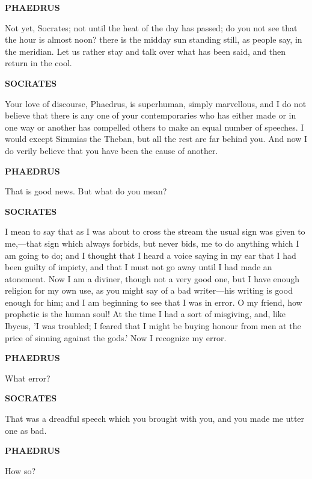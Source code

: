 \documentclass[11pt,letter]{article}
\begin{document}
\par \textbf{PHAEDRUS}
\par   Not yet, Socrates; not until the heat of the day has passed; do you not see that the hour is almost noon? there is the midday sun standing still, as people say, in the meridian. Let us rather stay and talk over what has been said, and then return in the cool.

\par \textbf{SOCRATES}
\par   Your love of discourse, Phaedrus, is superhuman, simply marvellous, and I do not believe that there is any one of your contemporaries who has either made or in one way or another has compelled others to make an equal number of speeches. I would except Simmias the Theban, but all the rest are far behind you. And now I do verily believe that you have been the cause of another.

\par \textbf{PHAEDRUS}
\par   That is good news. But what do you mean?

\par \textbf{SOCRATES}
\par   I mean to say that as I was about to cross the stream the usual sign was given to me,—that sign which always forbids, but never bids, me to do anything which I am going to do; and I thought that I heard a voice saying in my ear that I had been guilty of impiety, and that I must not go away until I had made an atonement. Now I am a diviner, though not a very good one, but I have enough religion for my own use, as you might say of a bad writer—his writing is good enough for him; and I am beginning to see that I was in error. O my friend, how prophetic is the human soul! At the time I had a sort of misgiving, and, like Ibycus, 'I was troubled; I feared that I might be buying honour from men at the price of sinning against the gods.' Now I recognize my error.

\par \textbf{PHAEDRUS}
\par   What error?

\par \textbf{SOCRATES}
\par   That was a dreadful speech which you brought with you, and you made me utter one as bad.

\par \textbf{PHAEDRUS}
\par   How so?
\end{document}
